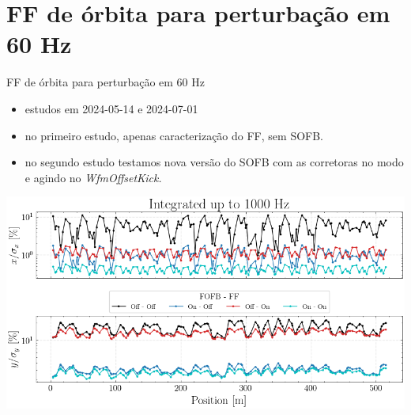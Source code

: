 \section{FF de órbita para perturbação em 60 Hz}



\begin{frame}{FF de órbita para perturbação em 60 Hz}

{\footnotesize
\begin{itemize}
    \setlength\itemsep{0.5em}
    \item estudos em 2024-05-14 e 2024-07-01 \href{https://ais-eng-srv-ta.cnpem.br/Olog/index.html\#22801\_4}{}
    \item no primeiro estudo, apenas caracterização do FF, sem SOFB.
    \item no segundo estudo testamos nova versão do SOFB com as corretoras no modo  e agindo no \it{WfmOffsetKick}.
\end{itemize}
}
\vspace{-0.2cm}
\centering
\includegraphics[width=0.7\linewidth]{2024-07-12/figures/integrated_distortion_up_to_1000Hz_run2.png}
\end{frame}
